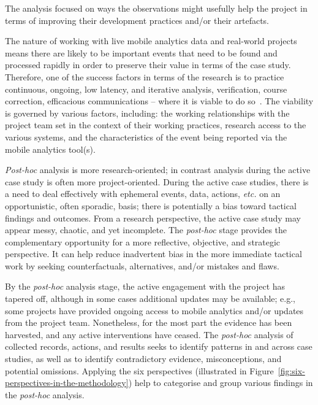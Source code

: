 The analysis focused on ways the observations might usefully help the project in terms of improving their development practices and/or their artefacts.

The nature of working with live mobile analytics data and real-world projects means there are likely to be important events that need to be found and processed rapidly in order to preserve their value in terms of the case study. Therefore, one of the success factors in terms of the research is to practice continuous, ongoing, low latency, and iterative analysis, verification, course correction, efficacious communications -- where it is viable to do so~. The viability is governed by various factors, including: the working relationships with the project team set in the context of their working practices, research access to the various systems, and the characteristics of the event being reported via the mobile analytics tool(s). 

\emph{Post-hoc} analysis is more research-oriented; in contrast analysis during the active case study is often more project-oriented. During the active case studies, there is a need to deal effectively with ephemeral events, data, actions, \textit{etc.} on an opportunistic, often sporadic, basis; there is potentially a bias toward tactical findings and outcomes. From a research perspective, the active case study may appear messy, chaotic, and yet incomplete. The \textit{post-hoc} stage provides the complementary opportunity for a more reflective, objective, and strategic perspective. It can help reduce inadvertent bias in the more immediate tactical work by seeking counterfactuals, alternatives, and/or mistakes and flaws.

By the \emph{post-hoc} analysis stage, the active engagement with the project has tapered off, although in some cases additional updates may be available; e.g., some projects have provided ongoing access to mobile analytics and/or updates from the project team. Nonetheless, for the most part the evidence has been harvested, and any active interventions have ceased. The  \emph{post-hoc} analysis of collected records, actions, and results seeks to identify patterns in and across case studies, as well as to identify contradictory evidence,  misconceptions, and potential omissions.  Applying the six perspectives (illustrated in Figure~\ref{fig:six-perspectives-in-the-methodology}) help to categorise and group various findings in the \emph{post-hoc} analysis. 


